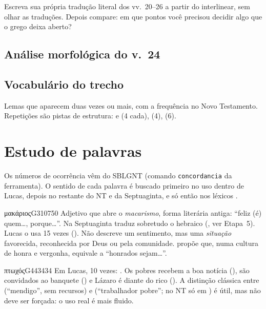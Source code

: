 \begin{pergunta}
Escreva sua própria tradução literal dos vv.~20–26 a partir do interlinear,
sem olhar as traduções. Depois compare: em que pontos você precisou decidir
algo que o grego deixa aberto?
\end{pergunta}

\subsection{Análise morfológica do v.~24}


\subsection{Vocabulário do trecho}

Lemas que aparecem duas vezes ou mais, com a frequência no Novo Testamento.
Repetições são pistas de estrutura:  e  (4 cada),
 (4),  (6).


\section{Estudo de palavras}

Os números de ocorrência vêm do SBLGNT (comando \texttt{concordancia} da
ferramenta). O sentido de cada palavra é buscado primeiro no uso dentro de
Lucas, depois no restante do NT e da Septuaginta, e só então nos léxicos
\parencite{silva1994, louwnida1988}.

\begin{lexico}{μακάριος}{G3107}{50}
Adjetivo que abre o \emph{macarismo}, forma literária antiga: \enquote{feliz
(é) quem\ldots, porque\ldots}. Na Septuaginta traduz sobretudo o hebraico
 (, ver Etapa~5). Lucas o usa 15 vezes (). Não descreve um
sentimento, mas uma \emph{situação} favorecida, reconhecida por Deus ou pela
comunidade. \textcite{hanson1994} propõe que, numa cultura de honra e
vergonha,  equivale a \enquote{honrados sejam\ldots}.
\end{lexico}

\begin{lexico}{πτωχός}{G4434}{34}
Em Lucas, 10 vezes: . Os pobres recebem a boa notícia (), são convidados ao
banquete () e Lázaro é  diante do rico ().
A distinção clássica entre  (\enquote{mendigo}, sem recursos) e
 (\enquote{trabalhador pobre}; no NT só em ) é
útil, mas não deve ser forçada: o uso real é mais fluido.
\end{lexico}

